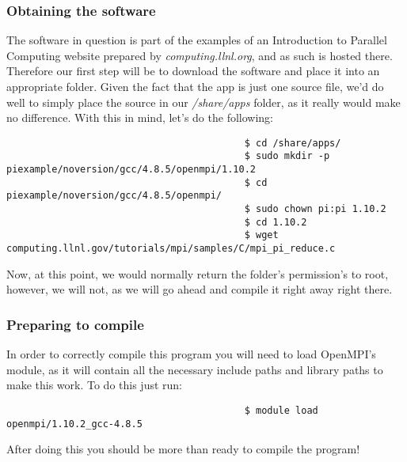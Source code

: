\documentclass[]{article}
\begin{document}
                                          \subsubsection{Obtaining the software}
                                          The software in question is part of the examples of an Introduction to Parallel Computing website prepared by 
                                          \textit{computing.llnl.org}, and as such is hosted there. Therefore our first step will be to download the software and place it into 
                                          an appropriate folder. Given the fact that the app is just one source file, we'd do well to simply place the source in our 
                                          \textit{/share/apps} folder, as it really would make no difference. With this in mind, let's do the following:
                                          \begin{lstlisting}
                                          $ cd /share/apps/
                                          $ sudo mkdir -p piexample/noversion/gcc/4.8.5/openmpi/1.10.2
                                          $ cd piexample/noversion/gcc/4.8.5/openmpi/
                                          $ sudo chown pi:pi 1.10.2
                                          $ cd 1.10.2
                                          $ wget computing.llnl.gov/tutorials/mpi/samples/C/mpi_pi_reduce.c
                                          \end{lstlisting}
                                          Now, at this point, we would normally return the folder's permission's to root, however, we will not, as we will go ahead and 
                                          compile it right away right there.

                                          \subsubsection{Preparing to compile}
                                          In order to correctly compile this program you will need to load OpenMPI's module, as it will contain all the necessary include paths 
                                          and library paths to make this work. To do this just run:
                                          \begin{lstlisting}
                                          $ module load openmpi/1.10.2_gcc-4.8.5
                                          \end{lstlisting}
                                          After doing this you should be more than ready to compile the program!
\end{document}
